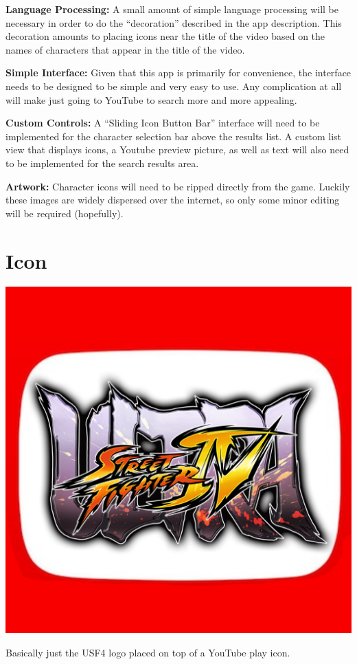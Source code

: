 \documentclass[10pt,letterpaper,final]{article}
\begin{document}
\textbf{Language Processing:} A small amount of simple language processing will be necessary in order to do the ``decoration'' described in the app description. This decoration amounts to placing icons near the title of the video based on the names of characters that appear in the title of the video.

\textbf{Simple Interface:} Given that this app is primarily for convenience, the interface needs to be designed to be simple and very easy to use. Any complication at all will make just going to YouTube to search more and more appealing.

\textbf{Custom Controls:} A ``Sliding Icon Button Bar'' interface will need to be implemented for the character selection bar above the results list. A custom list view that displays icons, a Youtube preview picture, as well as text will also need to be implemented for the search results area.

\textbf{Artwork:} Character icons will need to be ripped directly from the game. Luckily these images are widely dispersed over the internet, so only some minor editing will be required (hopefully).

\pagebreak
\section*{Icon}

\centerline{\includegraphics[scale=0.5]{icon.png}}

Basically just the USF4 logo placed on top of a YouTube play icon.
\end{document}

